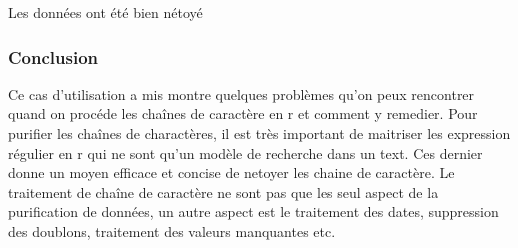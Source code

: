 \documentclass[
]{article}
\begin{document}
Les données ont été bien nétoyé

\hypertarget{conclusion}{%
\subsubsection{Conclusion}\label{conclusion}}

Ce cas d'utilisation a mis montre quelques problèmes qu'on peux
rencontrer quand on procéde les chaînes de caractère en r et comment y
remedier. Pour purifier les chaînes de charactères, il est très
important de maitriser les expression régulier en r qui ne sont qu'un
modèle de recherche dans un text. Ces dernier donne un moyen efficace et
concise de netoyer les chaine de caractère. Le traitement de chaîne de
caractère ne sont pas que les seul aspect de la purification de données,
un autre aspect est le traitement des dates, suppression des doublons,
traitement des valeurs manquantes etc.
\end{document}

